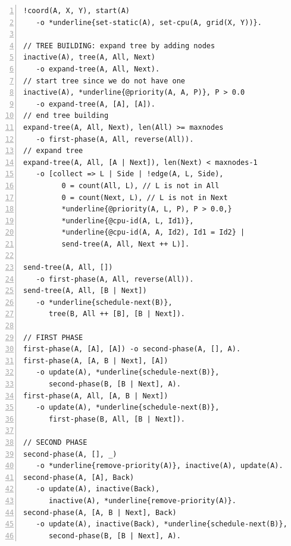 \begin{topfig}
\scriptsize\begin{Verbatim}[numbers=left,commandchars=*\{\}]
!coord(A, X, Y), start(A)
   -o *underline{set-static(A), set-cpu(A, grid(X, Y))}.

// TREE BUILDING: expand tree by adding nodes
inactive(A), tree(A, All, Next)
   -o expand-tree(A, All, Next).
// start tree since we do not have one
inactive(A), *underline{@priority(A, A, P)}, P > 0.0
   -o expand-tree(A, [A], [A]).
// end tree building
expand-tree(A, All, Next), len(All) >= maxnodes
   -o first-phase(A, All, reverse(All)).
// expand tree
expand-tree(A, All, [A | Next]), len(Next) < maxnodes-1
   -o [collect => L | Side | !edge(A, L, Side),
         0 = count(All, L), // L is not in All
         0 = count(Next, L), // L is not in Next
         *underline{@priority(A, L, P), P > 0.0,}
         *underline{@cpu-id(A, L, Id1)},
         *underline{@cpu-id(A, A, Id2), Id1 = Id2} |
         send-tree(A, All, Next ++ L)].

send-tree(A, All, [])
   -o first-phase(A, All, reverse(All)).
send-tree(A, All, [B | Next])
   -o *underline{schedule-next(B)},
      tree(B, All ++ [B], [B | Next]).

// FIRST PHASE
first-phase(A, [A], [A]) -o second-phase(A, [], A).
first-phase(A, [A, B | Next], [A])
   -o update(A), *underline{schedule-next(B)},
      second-phase(B, [B | Next], A).
first-phase(A, All, [A, B | Next])
   -o update(A), *underline{schedule-next(B)},
      first-phase(B, All, [B | Next]).

// SECOND PHASE
second-phase(A, [], _)
   -o *underline{remove-priority(A)}, inactive(A), update(A).
second-phase(A, [A], Back)
   -o update(A), inactive(Back),
      inactive(A), *underline{remove-priority(A)}.
second-phase(A, [A, B | Next], Back)
   -o update(A), inactive(Back), *underline{schedule-next(B)},
      second-phase(B, [B | Next], A).
\end{Verbatim}
\end{topfig}
\normalsize


